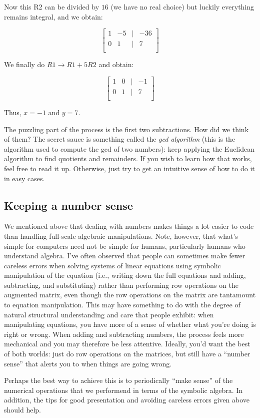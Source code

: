 \documentclass[10pt]{amsart}
\begin{document}
Now this R2 can be divided by $16$ (we have no real choice) but
luckily everything remains integral, and we obtain:

$$\left[\begin{matrix} 1 & -5 & \mid & -36\\ 0 & 1 & \mid & 7\\\end{matrix}\right]$$

We finally do $R1 \to R1 + 5 R2$ and obtain:

$$\left[\begin{matrix} 1 & 0 & \mid & -1\\ 0 & 1 & \mid & 7\\\end{matrix}\right]$$

Thus, $x = -1$ and $y = 7$.

The puzzling part of the process is the first two subtractions. How
did we think of them? The secret sauce is something called the {\em
  gcd algorithm} (this is the algorithm used to compute the gcd of two
numbers): keep applying the Euclidean algorithm to find quotients and
remainders. If you wish to learn how that works, feel free to read it
up. Otherwise, just try to get an intuitive sense of how to do it in
easy cases.
\subsection{Keeping a number sense}

We mentioned above that dealing with numbers makes things a lot easier
to code than handling full-scale algebraic manipulations. Note,
however, that what's simple for computers need not be simple for
humans, particularly humans who understand algebra. I've often
observed that people can sometimes make fewer careless errors when
solving systems of linear equations using symbolic manipulation of the
equation (i.e., writing down the full equations and adding,
subtracting, and substituting) rather than performing row operations
on the augmented matrix, even though the row operations on the matrix
are tantamount to equation manipulation. This may have something to do
with the degree of natural structural understanding and care that
people exhibit: when manipulating equations, you have more of a sense
of whether what you're doing is right or wrong. When adding and
subtracting numbers, the process feels more mechanical and you may
therefore be less attentive. Ideally, you'd want the best of both
worlds: just do row operations on the matrices, but still have a
``number sense'' that alerts you to when things are going wrong.

Perhaps the best way to achieve this is to periodically ``make sense''
of the numerical operations that we performend in terms of the
symbolic algebra. In addition, the tips for good presentation and
avoiding careless errors given above should help.
\end{document}
